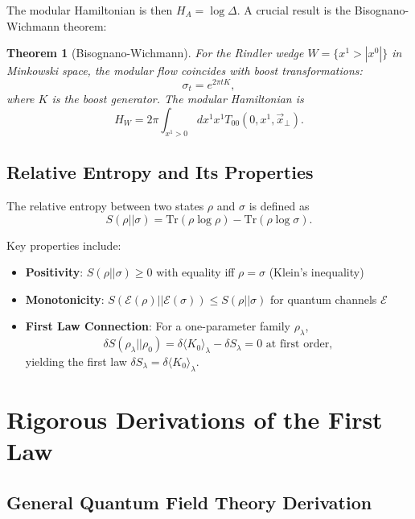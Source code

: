 \documentclass[11pt,letterpaper]{article}
\newtheorem{theorem}{Theorem}[section]
\begin{document}
The modular Hamiltonian is then $H_A = \log \Delta$. A crucial result is the Bisognano-Wichmann theorem:

\begin{theorem}[Bisognano-Wichmann]
For the Rindler wedge $W = \{x^1 > |x^0|\}$ in Minkowski space, the modular flow coincides with boost transformations:
\begin{equation}
\sigma_t = e^{2\pi t K},
\end{equation}
where $K$ is the boost generator. The modular Hamiltonian is
\begin{equation}
H_W = 2\pi \int_{x^1>0} dx^1 x^1 T_{00}(0,x^1,\vec{x}_\perp).
\end{equation}
\end{theorem}

\subsection{Relative Entropy and Its Properties}

The relative entropy between two states $\rho$ and $\sigma$ is defined as
\begin{equation}
S(\rho||\sigma) = \text{Tr}(\rho \log \rho) - \text{Tr}(\rho \log \sigma).
\end{equation}

Key properties include:
\begin{itemize}
\item \textbf{Positivity}: $S(\rho||\sigma) \geq 0$ with equality iff $\rho = \sigma$ (Klein's inequality)
\item \textbf{Monotonicity}: $S(\mathcal{E}(\rho)||\mathcal{E}(\sigma)) \leq S(\rho||\sigma)$ for quantum channels $\mathcal{E}$
\item \textbf{First Law Connection}: For a one-parameter family $\rho_\lambda$,
\begin{equation}
\delta S(\rho_\lambda||\rho_0) = \delta\langle K_0\rangle_\lambda - \delta S_\lambda = 0 \text{ at first order},
\end{equation}
yielding the first law $\delta S_\lambda = \delta\langle K_0\rangle_\lambda$.
\end{itemize}

\section{Rigorous Derivations of the First Law}

\subsection{General Quantum Field Theory Derivation}
\end{document}
